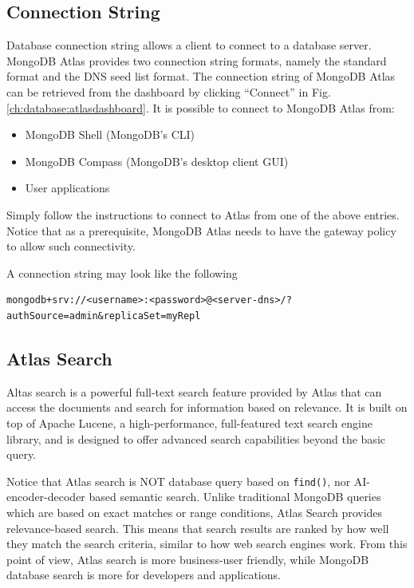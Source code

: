\subsection{Connection String}

Database connection string allows a client to connect to a database server. MongoDB Atlas provides two connection string formats, namely the standard format and the DNS seed list format. The connection string of MongoDB Atlas can be retrieved from the dashboard by clicking ``Connect'' in Fig. \ref{ch:database:atlasdashboard}. It is possible to connect to MongoDB Atlas from:
\begin{itemize}
  \item MongoDB Shell (MongoDB's CLI)
  \item MongoDB Compass (MongoDB's desktop client GUI)
  \item User applications
\end{itemize}
Simply follow the instructions to connect to Atlas from one of the above entries. Notice that as a prerequisite, MongoDB Atlas needs to have the gateway policy to allow such connectivity.

A connection string may look like the following
\begin{lstlisting}
mongodb+srv://<username>:<password>@<server-dns>/?authSource=admin&replicaSet=myRepl
\end{lstlisting}

\subsection{Atlas Search}

Altas search is a powerful full-text search feature provided by Atlas that can access the documents and search for information based on relevance.  It is built on top of Apache Lucene, a high-performance, full-featured text search engine library, and is designed to offer advanced search capabilities beyond the basic query. 

Notice that Atlas search is NOT database query based on \verb|find()|, nor AI-encoder-decoder based semantic search. Unlike traditional MongoDB queries which are based on exact matches or range conditions, Atlas Search provides relevance-based search. This means that search results are ranked by how well they match the search criteria, similar to how web search engines work. From this point of view, Atlas search is more business-user friendly, while MongoDB database search is more for developers and applications.

